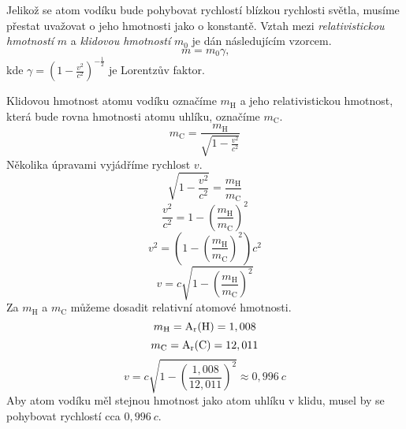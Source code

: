\documentclass{../../../../style/mkimain}
\begin{document}
\noindent{}
\klein
Jelikož se atom vodíku bude pohybovat rychlostí blízkou rychlosti světla, musíme přestat 
uvažovat o jeho hmotnosti jako o konstantě. Vztah mezi \emph{relativistickou hmotností} $m$ 
a \emph{klidovou hmotností} $m_0$ je dán následujícím vzorcem.
$$
m=m_0\gamma\text{,}
$$
kde $\gamma=\left(1-\frac{v^2}{c^2}\right)^{-\frac{1}{2}}$ je Lorentzův faktor.

Klidovou hmotnost atomu vodíku označíme $m_\mathrm{H}$ a jeho relativistickou hmotnost, která 
bude rovna hmotnosti atomu uhlíku, označíme $m_\mathrm{C}$. 
$$
m_\mathrm{C}=\frac{m_\mathrm{H}}{\sqrt{1-\frac{v^2}{c^2}}}
$$
Několika úpravami vyjádříme rychlost $v$.
$$
\sqrt{1-\frac{v^2}{c^2}}=\frac{m_\mathrm{H}}{m_\mathrm{C}}
$$
$$
\frac{v^2}{c^2}=1-\left(\frac{m_\mathrm{H}}{m_\mathrm{C}}\right)^2
$$
$$
v^2=\left(1-\left(\frac{m_\mathrm{H}}{m_\mathrm{C}}\right)^2\right)c^2
$$
$$
v=c\sqrt{1-\left(\frac{m_\mathrm{H}}{m_\mathrm{C}}\right)^2}
$$
Za $m_\mathrm{H}$ a $m_\mathrm{C}$ můžeme dosadit relativní atomové hmotnosti.
$$
m_\mathrm{H}=\mathrm{A_r(\ce{H})}=1,008
$$
$$
m_\mathrm{C}=\mathrm{A_r(\ce{C})}=12,011
$$
$$
v=c\sqrt{1-\left(\frac
{1,008}{12,011}\right)^2}\approx0,996\ c
$$
Aby atom vodíku měl stejnou hmotnost jako atom uhlíku v klidu, musel by se pohybovat rychlostí cca $0,996\ c$.\\
\end{document}
